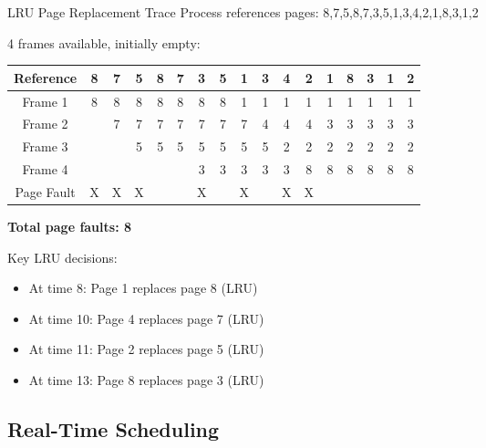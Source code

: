 \begin{example2}{LRU Page Replacement Trace}
    Process references pages: 8,7,5,8,7,3,5,1,3,4,2,1,8,3,1,2
    
    4 frames available, initially empty:
    
    \begin{tabular}{|c|c|c|c|c|c|c|c|c|c|c|c|c|c|c|c|c|}
        \hline
        Reference & 8 & 7 & 5 & 8 & 7 & 3 & 5 & 1 & 3 & 4 & 2 & 1 & 8 & 3 & 1 & 2 \\
        \hline
        Frame 1 & 8 & 8 & 8 & 8 & 8 & 8 & 8 & 1 & 1 & 1 & 1 & 1 & 1 & 1 & 1 & 1 \\
        Frame 2 &  & 7 & 7 & 7 & 7 & 7 & 7 & 7 & 4 & 4 & 4 & 3 & 3 & 3 & 3 & 3 \\
        Frame 3 &  &  & 5 & 5 & 5 & 5 & 5 & 5 & 5 & 2 & 2 & 2 & 2 & 2 & 2 & 2 \\
        Frame 4 &  &  &  &  &  & 3 & 3 & 3 & 3 & 3 & 8 & 8 & 8 & 8 & 8 & 8 \\
        \hline
        Page Fault & X & X & X &  &  & X &  & X &  & X & X &  &  &  &  &  \\
        \hline
    \end{tabular}
    
    \tcblower
    
    \textbf{Total page faults: 8}
    
    Key LRU decisions:
    \begin{itemize}
        \item At time 8: Page 1 replaces page 8 (LRU)
        \item At time 10: Page 4 replaces page 7 (LRU) 
        \item At time 11: Page 2 replaces page 5 (LRU)
        \item At time 13: Page 8 replaces page 3 (LRU)
    \end{itemize}
\end{example2}

\subsection{Real-Time Scheduling}

